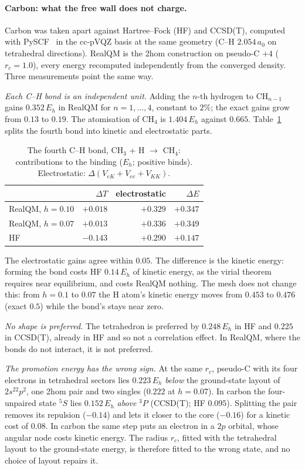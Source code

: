 \documentclass[11pt]{article}
\begin{document}
\paragraph{Carbon: what the free wall does not charge.} Carbon was taken apart against Hartree--Fock
(HF) and CCSD(T), computed with PySCF~\cite{pyscf} in the cc-pVQZ basis at the same geometry (C--H
$2.054\,a_0$ on tetrahedral directions). RealQM is the 2hom construction on pseudo-C $+4$ ($r_c = 1.0$),
every energy recomputed independently from the converged density. Three measurements point the same way.

\emph{Each C--H bond is an independent unit.} Adding the $n$-th hydrogen to CH$_{n-1}$ gains $0.352\,E_h$ in
RealQM for $n = 1,\dots,4$, constant to $2\%$; the exact gains grow from $0.13$ to $0.19$. The atomisation
of CH$_4$ is $1.404\,E_h$ against $0.665$. Table~\ref{tab:c-h-bond} splits the fourth bond into kinetic and
electrostatic parts.
\begin{table}[h]
\centering\small
\caption{The fourth C--H bond, CH$_3$ + H $\to$ CH$_4$: contributions to the binding ($E_h$; positive
binds). Electrostatic: $\Delta(V_{eK}+V_{ee}+V_{KK})$.}\label{tab:c-h-bond}
\begin{tabular}{lrrr}
\toprule
 & $\Delta T$ & electrostatic & $\Delta E$ \\
\midrule
RealQM, $h = 0.10$ & $+0.018$ & $+0.329$ & $+0.347$ \\
RealQM, $h = 0.07$ & $+0.013$ & $+0.336$ & $+0.349$ \\
HF                 & $-0.143$ & $+0.290$ & $+0.147$ \\
\bottomrule
\end{tabular}
\end{table}
The electrostatic gains agree within $0.05$. The difference is the kinetic energy: forming the bond costs
HF $0.14\,E_h$ of kinetic energy, as the virial theorem requires near equilibrium, and costs RealQM
nothing. The mesh does not change this: from $h = 0.1$ to $0.07$ the H atom's kinetic energy moves
from $0.453$ to $0.476$ (exact $0.5$) while the bond's stays near zero.

\emph{No shape is preferred.} The tetrahedron is preferred by $0.248\,E_h$ in HF and $0.225$ in CCSD(T),
already in HF and so not a correlation effect. In RealQM, where the bonds do not interact, it is not
preferred.

\emph{The promotion energy has the wrong sign.} At the same $r_c$, pseudo-C with its four electrons in
tetrahedral sectors lies $0.223\,E_h$ \emph{below} the ground-state layout of $2s^22p^2$, one 2hom pair and
two singles ($0.222$ at $h = 0.07$). In carbon the four-unpaired state $^5S$ lies $0.152\,E_h$ \emph{above}
$^3P$ (CCSD(T); HF $0.095$). Splitting the pair removes its repulsion ($-0.14$) and lets it closer to the
core ($-0.16$) for a kinetic cost of $0.08$. In carbon the same step puts an electron in a $2p$ orbital,
whose angular node costs kinetic energy. The radius $r_c$, fitted with the tetrahedral layout to the
ground-state energy, is therefore fitted to the wrong state, and no choice of layout repairs it.
\end{document}

